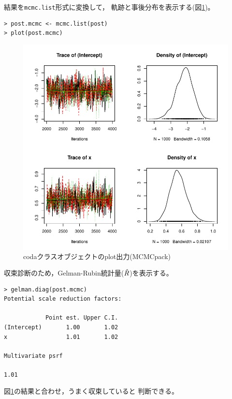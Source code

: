 \documentclass[11pt,uplatex]{jsarticle}
\begin{document}
結果を\texttt{mcmc.list}形式に変換して，
軌跡と事後分布を表示する(図\ref{plot_coda_mcmcpack})。
\begin{lstlisting}
> post.mcmc <- mcmc.list(post)
> plot(post.mcmc)
\end{lstlisting}


\begin{figure}[htbp]
	\begin{center}
		\includegraphics[bb=0 0 400 400, clip, width=300 bp]{example2_results.pdf}
	\end{center}
	\caption{\textsf{coda}クラスオブジェクトのplot出力(MCMCpack)}
	\label{plot_coda_mcmcpack}
\end{figure}

\vspace{3zw}

収束診断のため，Gelman-Rubin統計量($\Hat{R}$)を表示する。
\begin{lstlisting}
> gelman.diag(post.mcmc)
Potential scale reduction factors:

            Point est. Upper C.I.
(Intercept)       1.00       1.02
x                 1.01       1.02

Multivariate psrf

1.01
\end{lstlisting}
図\ref{plot_coda_mcmcpack}の結果と合わせ，うまく収束していると
判断できる。
\end{document}

